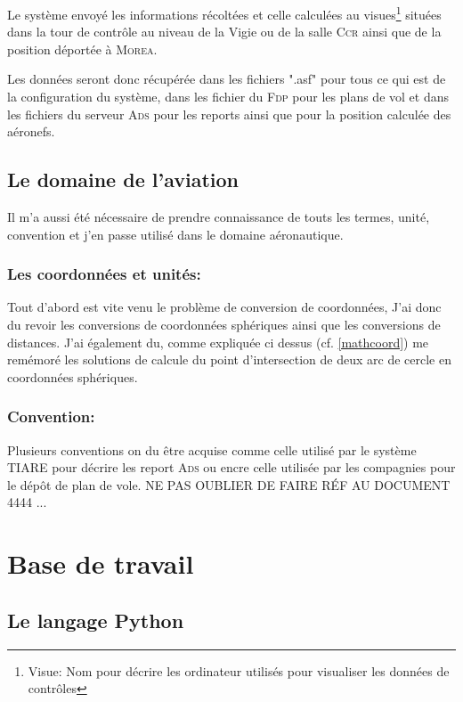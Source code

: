 Le système envoyé les informations récoltées et celle calculées au visues\footnote{Visue: Nom pour décrire les ordinateur utilisés pour visualiser les données de contrôles} situées dans la tour de contrôle au niveau de la Vigie ou de la salle \textsc{Ccr} ainsi que de la position déportée à \textsc{Morea}.

Les données seront donc récupérée dans les fichiers ".asf" pour tous ce qui est de la configuration du système, dans les fichier du \textsc{Fdp} pour les plans de vol et dans les fichiers du serveur \textsc{Ads} pour les reports ainsi que pour la position calculée des aéronefs.

    \subsection{Le domaine de l'aviation}
Il m'a aussi été nécessaire de prendre connaissance de touts les termes, unité, convention et j'en passe utilisé dans le domaine aéronautique.

        \subsubsection{Les coordonnées et unités:}
Tout d'abord est vite venu le problème de conversion de coordonnées, J'ai donc du revoir les conversions de coordonnées sphériques ainsi que les conversions de distances.
J'ai également du, comme expliquée ci dessus (cf. \vref{mathcoord})
me remémoré les solutions de calcule du point d'intersection de deux arc de cercle en coordonnées sphériques.

        \subsubsection{Convention:}
Plusieurs conventions on du être acquise comme celle utilisé par le système TIARE pour décrire les report \textsc{Ads} ou encre celle utilisée par les compagnies pour le dépôt de plan de vole.
NE PAS OUBLIER DE FAIRE RÉF AU DOCUMENT 4444 ...





\section{Base de travail}
    \subsection{Le langage Python}
